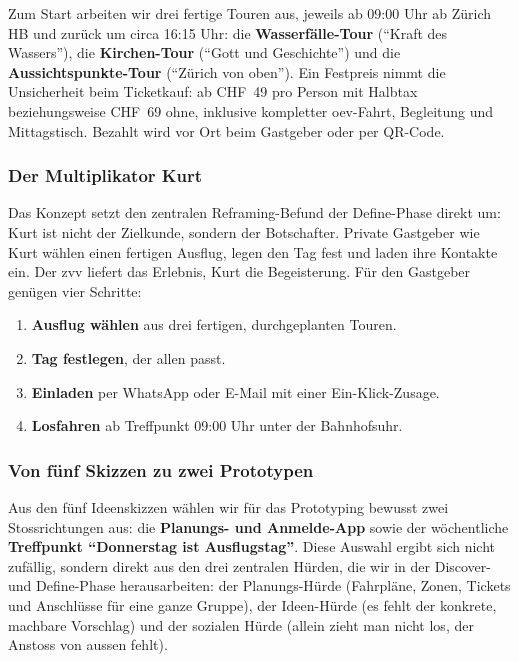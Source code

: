 Zum Start arbeiten wir drei fertige Touren aus, jeweils ab 09:00 Uhr ab Zürich HB und zurück um circa 16:15 Uhr: die \textbf{Wasserfälle-Tour} (\enquote{Kraft des Wassers}), die \textbf{Kirchen-Tour} (\enquote{Gott und Geschichte}) und die \textbf{Aussichtspunkte-Tour} (\enquote{Zürich von oben}). Ein Festpreis nimmt die Unsicherheit beim Ticketkauf: ab CHF~49 pro Person mit Halbtax beziehungsweise CHF~69 ohne, inklusive kompletter \gls{oev}-Fahrt, Begleitung und Mittagstisch. Bezahlt wird vor Ort beim Gastgeber oder per QR-Code.

\subsubsection{Der Multiplikator Kurt}
Das Konzept setzt den zentralen Reframing-Befund der Define-Phase direkt um: Kurt ist nicht der Zielkunde, sondern der Botschafter. Private Gastgeber wie Kurt wählen einen fertigen Ausflug, legen den Tag fest und laden ihre Kontakte ein. Der \gls{zvv} liefert das Erlebnis, Kurt die Begeisterung. Für den Gastgeber genügen vier Schritte:

\begin{enumerate}
  \item \textbf{Ausflug wählen} aus drei fertigen, durchgeplanten Touren.
  \item \textbf{Tag festlegen}, der allen passt.
  \item \textbf{Einladen} per WhatsApp oder E-Mail mit einer Ein-Klick-Zusage.
  \item \textbf{Losfahren} ab Treffpunkt 09:00 Uhr unter der Bahnhofsuhr.
\end{enumerate}

\subsubsection{Von fünf Skizzen zu zwei Prototypen}
Aus den fünf Ideenskizzen wählen wir für das Prototyping bewusst zwei Stossrichtungen aus: die \textbf{Planungs- und Anmelde-App} sowie der wöchentliche \textbf{Treffpunkt \enquote{Donnerstag ist Ausflugstag}}. Diese Auswahl ergibt sich nicht zufällig, sondern direkt aus den drei zentralen Hürden, die wir in der Discover- und Define-Phase herausarbeiten: der Planungs-Hürde (Fahrpläne, Zonen, Tickets und Anschlüsse für eine ganze Gruppe), der Ideen-Hürde (es fehlt der konkrete, machbare Vorschlag) und der sozialen Hürde (allein zieht man nicht los, der Anstoss von aussen fehlt).

